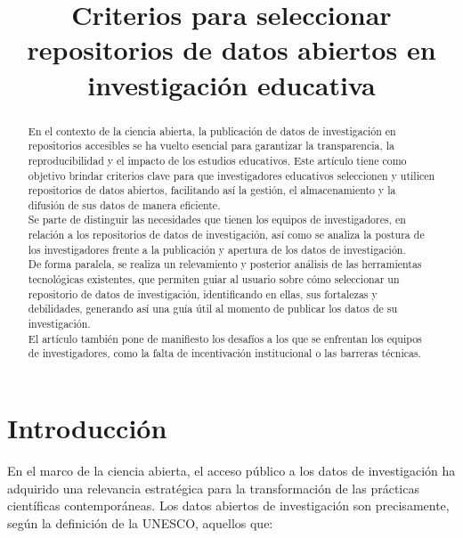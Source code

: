 \documentclass{article}
\title{Criterios para seleccionar repositorios de datos abiertos en investigación educativa}
\author{}
\begin{document}
\maketitle

\begin{abstract}
En el contexto de la ciencia abierta, la publicación de datos de investigación en repositorios accesibles se ha vuelto esencial para garantizar la transparencia, la reproducibilidad y el impacto de los estudios educativos. Este artículo tiene como objetivo brindar criterios clave para que investigadores educativos seleccionen y utilicen repositorios de datos abiertos, facilitando así la gestión, el almacenamiento y la difusión de sus datos de manera eficiente.\\

Se parte de distinguir las necesidades que tienen los equipos de investigadores, en relación a los repositorios de datos de investigación, así como se analiza la postura de los investigadores frente a la publicación y apertura de los datos de investigación.\\

De forma paralela, se realiza un relevamiento y posterior análisis de las herramientas tecnológicas existentes, que permiten guiar al usuario sobre cómo seleccionar un repositorio de datos de investigación, identificando en ellas, sus fortalezas y debilidades, generando así una guía útil al momento de publicar los datos de su investigación.\\

El artículo también pone de manifiesto los desafíos a los que se enfrentan los equipos de investigadores, como la falta de incentivación institucional o las barreras técnicas.\\

\end{abstract}

\section{Introducción}

En el marco de la ciencia abierta, el acceso público a los datos de investigación ha adquirido una relevancia estratégica para la transformación de las prácticas científicas contemporáneas. Los datos abiertos de investigación son precisamente, según la definición de la UNESCO, aquellos que:
\end{document}
